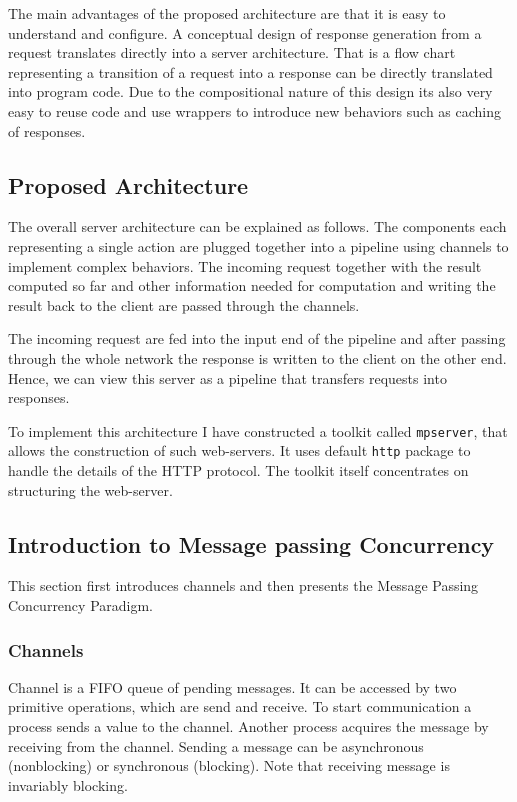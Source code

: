 \documentclass[12pt,a4paper]{article}
\begin{document}
The main advantages of the proposed architecture are that it is easy to understand
and configure. A conceptual design of response generation from a request translates 
directly into a server architecture. That is a flow chart representing a transition
of a request into a response can be directly translated into program code.
Due to the compositional nature of this design its also very easy to reuse code
and use wrappers to introduce new behaviors such as caching of responses.

\subsection{Proposed Architecture}
The overall server architecture can be explained as follows.
The components each representing a single action are plugged together into 
a pipeline using channels to implement complex behaviors. The incoming
request together with the result computed so far and other 
information needed for computation and writing the result back to the client
are passed through the channels.

The incoming request are fed into the input end of the pipeline and 
after passing through the whole network the response is written to the
client on the other end. Hence, we can view this server
as a pipeline that transfers requests into responses.

To implement this architecture I have constructed a toolkit called 
\texttt{mpserver}, that allows the construction of such web-servers.
It uses default \texttt{http} package to handle the details of
the HTTP protocol. The toolkit itself concentrates on structuring the 
web-server.


\subsection{Introduction to Message passing Concurrency}
This section first introduces channels and then presents the Message
Passing Concurrency Paradigm.

\subsubsection{Channels}
Channel is a FIFO queue of pending messages. It can be accessed by two
primitive operations, which are send and receive. To start communication
a process sends a value to the channel. Another process acquires the message
by receiving from the channel. Sending a message can be asynchronous (nonblocking)
or synchronous (blocking). Note that receiving message is invariably blocking.
\cite[293]{book:foundations}
\end{document}

